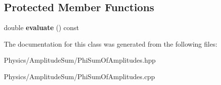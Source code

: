 \subsection*{Protected Member Functions}
\begin{DoxyCompactItemize}
\item 
\hypertarget{class_phi_sum_of_amplitudes_ab139ef52a14d1f51e74da3ec428a2a4d}{double {\bfseries evaluate} () const }\label{class_phi_sum_of_amplitudes_ab139ef52a14d1f51e74da3ec428a2a4d}

\end{DoxyCompactItemize}


The documentation for this class was generated from the following files\-:\begin{DoxyCompactItemize}
\item 
Physics/\-Amplitude\-Sum/Phi\-Sum\-Of\-Amplitudes.\-hpp\item 
Physics/\-Amplitude\-Sum/Phi\-Sum\-Of\-Amplitudes.\-cpp\end{DoxyCompactItemize}
